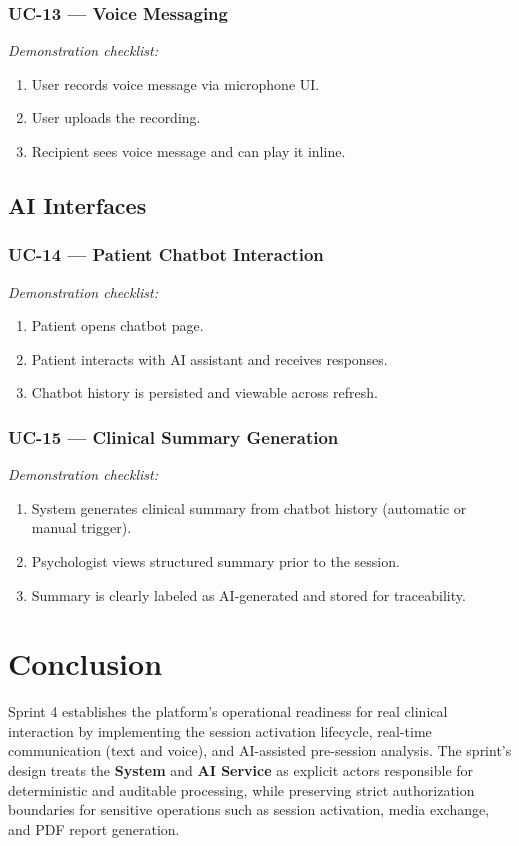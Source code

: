 \documentclass[12pt]{article}
\begin{document}
\subsubsection*{UC-13 --- Voice Messaging}
\textit{Demonstration checklist:}
\begin{enumerate}[leftmargin=*]
  \item User records voice message via microphone UI.
  \item User uploads the recording.
  \item Recipient sees voice message and can play it inline.
\end{enumerate}

\subsection{AI Interfaces}
\subsubsection*{UC-14 --- Patient Chatbot Interaction}
\textit{Demonstration checklist:}
\begin{enumerate}[leftmargin=*]
  \item Patient opens chatbot page.
  \item Patient interacts with AI assistant and receives responses.
  \item Chatbot history is persisted and viewable across refresh.
\end{enumerate}

\subsubsection*{UC-15 --- Clinical Summary Generation}
\textit{Demonstration checklist:}
\begin{enumerate}[leftmargin=*]
  \item System generates clinical summary from chatbot history (automatic or manual trigger).
  \item Psychologist views structured summary prior to the session.
  \item Summary is clearly labeled as AI-generated and stored for traceability.
\end{enumerate}

\section{Conclusion}
Sprint 4 establishes the platform's operational readiness for real clinical interaction by implementing the session activation lifecycle, real-time communication (text and voice), and AI-assisted pre-session analysis. The sprint's design treats the \textbf{System} and \textbf{AI Service} as explicit actors responsible for deterministic and auditable processing, while preserving strict authorization boundaries for sensitive operations such as session activation, media exchange, and PDF report generation.
\end{document}
